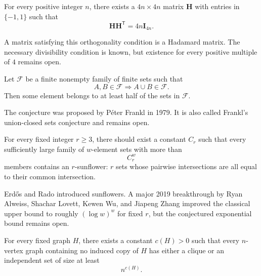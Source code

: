     \begin{conjecture}
        For every positive integer $n$, there exists a $4n\times 4n$ matrix
        $\mathbf{H}$ with entries in $\{-1,1\}$ such that
        \[
            \mathbf{H}\mathbf{H}^{\mathsf T}
            =
            4n\mathbf{I}_{4n}.
        \]
    \end{conjecture}

    \begin{remark}
        A matrix satisfying this orthogonality condition is a Hadamard matrix.
        The necessary divisibility condition is known, but existence for every
        positive multiple of $4$ remains open.
    \end{remark}

    \begin{conjecture}
        Let $\mathcal{F}$ be a finite nonempty family of finite sets such that
        \[
            A,B\in\mathcal{F}
            \Rightarrow
            A\cup B\in\mathcal{F}.
        \]
        Then some element belongs to at least half of the sets in
        $\mathcal{F}$.
    \end{conjecture}

    \begin{remark}
        The conjecture was proposed by Péter Frankl in 1979. It is also called
        Frankl's union-closed sets conjecture and remains open.
    \end{remark}


    \begin{conjecture}
        For every fixed integer $r\geq 3$, there should exist a constant $C_r$
        such that every sufficiently large family of $w$-element sets with more than
        \[
            C_r^w
        \]
        members contains an $r$-sunflower: $r$ sets whose pairwise intersections
        are all equal to their common intersection.
    \end{conjecture}

    \begin{remark}
        Erd\H{o}s and Rado introduced sunflowers. A major 2019 breakthrough by
        Ryan Alweiss, Shachar Lovett, Kewen Wu, and Jiapeng Zhang improved the
        classical upper bound to roughly $(\log w)^w$ for fixed $r$, but the
        conjectured exponential bound remains open.
    \end{remark}

    \begin{conjecture}
        For every fixed graph $H$, there exists a constant $c(H)>0$ such that every
        $n$-vertex graph containing no induced copy of $H$ has either a clique or
        an independent set of size at least
        \[
            n^{c(H)}.
        \]
    \end{conjecture}

